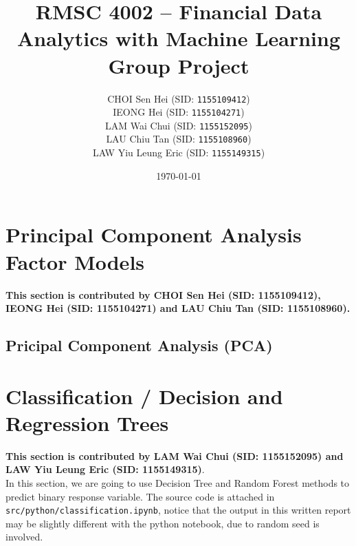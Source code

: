 \documentclass[11pt,a4paper]{article}
\begin{document}
    \thispagestyle{empty}
    \title{\textsc{RMSC 4002} -- Financial Data Analytics with Machine Learning \\ Group Project}
    \author{
        CHOI Sen Hei (SID: \texttt{1155109412}) \\
        IEONG Hei (SID: \texttt{1155104271}) \\
        LAM Wai Chui (SID: \texttt{1155152095}) \\
        LAU Chiu Tan (SID: \texttt{1155108960}) \\
        LAW Yiu Leung Eric (SID: \texttt{1155149315})
    }
    \date{\today}
    \maketitle
    
    \tableofcontents
    \newpage
    
    
    \setcounter{page}{1}
    
    \section{Principal Component Analysis Factor Models}
    \textbf{This section is contributed by CHOI Sen Hei (SID: 1155109412), IEONG Hei (SID: 1155104271) and LAU Chiu Tan (SID: 1155108960).}
    
    \subsection{Pricipal Component Analysis (PCA)}
    
    
    \newpage
    \section{Classification / Decision and Regression Trees}
    \textbf{This section is contributed by LAM Wai Chui (SID: 1155152095) and LAW Yiu Leung Eric (SID: 1155149315)}. \\
    In this section, we are going to use Decision Tree and Random Forest methods to predict binary response variable. The source code is attached in \texttt{src/python/classification.ipynb}, notice that the output in this written report may be slightly different with the python notebook, due to random seed is involved.
    
\end{document}
